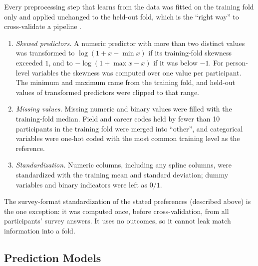 Every preprocessing step that learns from the data was fitted on the training fold only and applied unchanged to
the held-out fold, which is the ``right way'' to cross-validate a pipeline \cite[Section 7.10.2, pp.~245--247]{Hastie:2009}.

\begin{enumerate}
\item \emph{Skewed predictors.} A numeric predictor with more than two distinct values was transformed to
$\log(1+x-\min x)$ if its training-fold skewness exceeded $1$, and to $-\log(1+\max x-x)$ if it was below $-1$. For
person-level variables the skewness was computed over one value per participant. The minimum and maximum came from
the training fold, and held-out values of transformed predictors were clipped to that range.
\item \emph{Missing values.} Missing numeric and binary values were filled with the training-fold median. Field and
career codes held by fewer than 10 participants in the training fold were merged into ``other'', and categorical
variables were one-hot coded with the most common training level as the reference.
\item \emph{Standardization.} Numeric columns, including any spline columns, were standardized with the training
mean and standard deviation; dummy variables and binary indicators were left as $0/1$.
\end{enumerate}

The survey-format standardization of the stated preferences (described above) is the one exception: it was computed
once, before cross-validation, from all participants' survey answers. It uses no outcomes, so it cannot leak match
information into a fold.

\subsection{Prediction Models}

